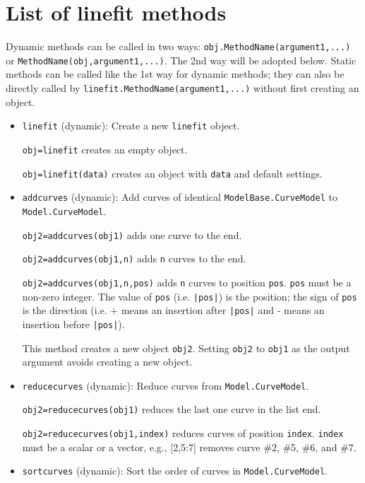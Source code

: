 \documentclass[reprint,showpacs,prb,nofootinbib,amsmath,amssymb]{revtex4-1}
\begin{document}
\section{List of \textbf{linefit} methods}\label{app:methods}

Dynamic methods can be called in two ways: \verb|obj.MethodName(argument1,...)| or \verb|MethodName(obj,argument1,...)|. The 2nd way will be adopted below. Static methods can be called like the 1st way for dynamic methods; they can also be directly called by \verb|linefit.MethodName(argument1,...)| without first creating an object.

\begin{itemize}
\item \verb|linefit| (dynamic): Create a new \verb"linefit" object.

\verb|obj=linefit| creates an empty object. 

\verb|obj=linefit(data)| creates an object with \verb|data| and default settings.

\item \verb|addcurves| (dynamic): Add curves of identical \verb|ModelBase.CurveModel| to \verb|Model.CurveModel|.

\verb|obj2=addcurves(obj1)| adds one curve to the end. 

\verb|obj2=addcurves(obj1,n)| adds \verb|n| curves to the end. 

\verb|obj2=addcurves(obj1,n,pos)| adds \verb|n| curves to position \verb|pos|. \verb|pos| must be a non-zero integer. The value of \verb|pos| (i.e. \verb"|pos|") is the position; the sign of \verb|pos| is the direction (i.e. + means an insertion after \verb"|pos|" and - means an insertion before \verb"|pos|"). 

This method creates a new object \verb|obj2|. Setting \verb|obj2| to \verb|obj1| as the output argument avoids creating a new object.

\item \verb|reducecurves| (dynamic): Reduce curves from \verb|Model.CurveModel|.

\verb|obj2=reducecurves(obj1)| reduces the last one curve in the list end. 

\verb|obj2=reducecurves(obj1,index)| reduces curves of position \verb|index|. \verb|index| must be a scalar or a vector, e.g., [2,5:7] removes curve \#2, \#5, \#6, and \#7.

\item \verb|sortcurves| (dynamic): Sort the order of curves in \verb|Model.CurveModel|.


\end{itemize}
\end{document}
